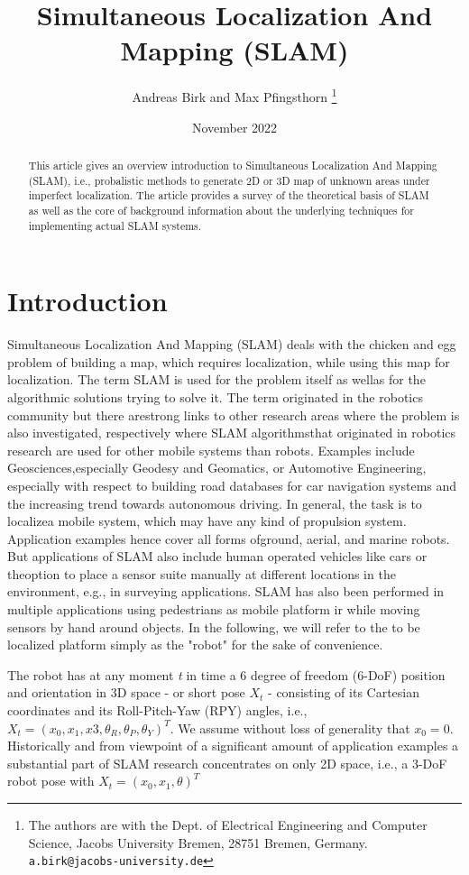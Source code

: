 \documentclass{article}
\title{Simultaneous Localization And Mapping (SLAM)}
\author{Andreas Birk and Max Pfingsthorn
\thanks{The authors are with the Dept. of Electrical Engineering and Computer Science, Jacobs University Bremen, 28751
Bremen, Germany. {\tt\small
a.birk@jacobs-university.de}}}
\date{November 2022}
\begin{document}
\maketitle
\begin{abstract}
    This article gives an overview introduction to Simultaneous Localization And Mapping (SLAM), i.e., probalistic methods to generate 2D or 3D map of unknown areas under imperfect localization. The article provides a survey of the theoretical basis of SLAM as well as the core of background information about the underlying techniques for implementing actual SLAM systems.
\end{abstract}

\section{Introduction}

Simultaneous Localization And Mapping (SLAM) deals with the chicken and egg problem of building a map, which requires localization, while using this map for localization. The term SLAM is used for the problem itself as wellas for the algorithmic solutions trying to solve it. The term originated in the robotics community but there arestrong links to other research areas where the problem is also investigated, respectively where SLAM algorithmsthat originated in robotics research are used for other mobile systems than robots. Examples include Geosciences,especially Geodesy and Geomatics, or Automotive Engineering, especially with respect to building road databases for car navigation systems and the increasing trend towards autonomous driving. In general, the task is to localizea mobile system, which may have any kind of propulsion system. Application examples hence cover all forms ofground, aerial, and marine robots.  But applications of SLAM also include human operated vehicles like cars or theoption to place a sensor suite manually at different locations in the environment, e.g., in surveying applications. SLAM has also been performed in multiple applications using pedestrians as mobile platform ir while moving sensors by hand around objects. In the following, we will refer to the to be localized platform simply as the "robot" for the sake of convenience.

The robot has at any moment \textit{t} in time a 6 degree of freedom (6-DoF) position and orientation in 3D space - or short pose $X_{t}$ - consisting of its Cartesian coordinates and its Roll-Pitch-Yaw (RPY) angles, i.e., $X_{t} = \left(x_{0},x_{1},x{3},\theta_{R},\theta_{P},\theta_{Y}\right)^T$. We assume without loss of generality that $x_{0} = 0$. Historically and from viewpoint of a significant amount of application examples a substantial part of SLAM research concentrates on only 2D space, i.e., a 3-DoF robot pose with $X_{t} = \left( x_{0},x_{1},\theta\right)^T$
\end{document}
